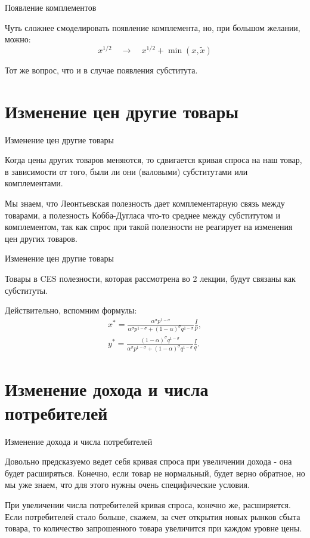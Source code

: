 \documentclass{beamer}
\begin{document}
\begin{frame}{Появление комплементов}

Чуть сложнее смоделировать появление комплемента, но, при большом желании, можно:
$$ x^{1/2} \quad \to \quad x^{1/2} + \min(x, \tilde x)$$

Тот же вопрос, что и в случае появления субститута.

\end{frame}

\section{Изменение цен другие товары}

\begin{frame}{Изменение цен другие товары}

Когда цены других товаров меняются, то сдвигается кривая спроса на наш товар, в зависимости от того, были ли они (валовыми) субститутами или комплементами.

Мы знаем, что Леонтьевская полезность дает комплементарную связь между товарами, а полезность Кобба-Дугласа что-то среднее между субститутом и комплементом, так как спрос при такой полезности не реагирует на изменения цен других товаров. 
	
\end{frame}

\begin{frame}{Изменение цен другие товары}

Товары в CES полезности, которая рассмотрена во 2 лекции, будут связаны как субституты. 

Действительно, вспомним формулы:
\begin{gather*}
x^{\ast} = \frac{\alpha^{\sigma} p^{1-\sigma}}{\alpha^{\sigma} p^{1-\sigma} + (1-\alpha)^{\sigma} q^{1-\sigma}}\frac{I}{p},\\
y^{\ast} = \frac{(1-\alpha)^{\sigma} q^{1-\sigma}}{\alpha^{\sigma} p^{1-\sigma} + (1-\alpha)^{\sigma} q^{1-\sigma}}\frac{I}{q}.
\end{gather*}
	
\end{frame}

\section{Изменение дохода и числа потребителей}

\begin{frame}{Изменение дохода и числа потребителей}

Довольно предсказуемо ведет себя кривая спроса при увеличении дохода - она будет расширяться. Конечно, если товар не нормальный, будет верно обратное, но мы уже знаем, что для этого нужны очень специфические условия.

При увеличении числа потребителей кривая спроса, конечно же, расширяется. Если потребителей стало больше, скажем, за счет открытия новых рынков сбыта товара, то количество запрошенного товара увеличится при каждом уровне цены.

\end{frame}
\end{document}
